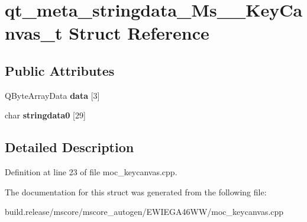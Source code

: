 \hypertarget{structqt__meta__stringdata___ms_____key_canvas__t}{}\section{qt\+\_\+meta\+\_\+stringdata\+\_\+\+Ms\+\_\+\+\_\+\+Key\+Canvas\+\_\+t Struct Reference}
\label{structqt__meta__stringdata___ms_____key_canvas__t}
\subsection*{Public Attributes}
\begin{DoxyCompactItemize}
\item 
\mbox{\label{structqt__meta__stringdata___ms_____key_canvas__t_adaec63e1149d875f91edcea281d97447}} 
Q\+Byte\+Array\+Data {\bfseries data} \mbox{[}3\mbox{]}
\item 
\mbox{\label{structqt__meta__stringdata___ms_____key_canvas__t_a5ac16f7b697fc29312b932fd034a29df}} 
char {\bfseries stringdata0} \mbox{[}29\mbox{]}
\end{DoxyCompactItemize}


\subsection{Detailed Description}


Definition at line 23 of file moc\+\_\+keycanvas.\+cpp.



The documentation for this struct was generated from the following file\+:\begin{DoxyCompactItemize}
\item 
build.\+release/mscore/mscore\+\_\+autogen/\+E\+W\+I\+E\+G\+A46\+W\+W/moc\+\_\+keycanvas.\+cpp\end{DoxyCompactItemize}
